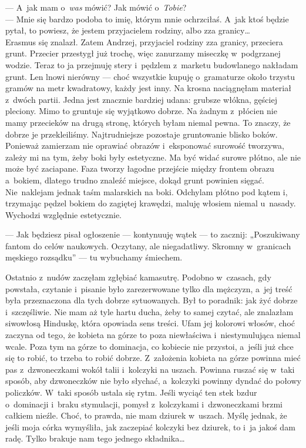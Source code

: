 \documentclass[9pt, a5paper]{memoir}
\begin{document}
--- A~jak mam o~\textit{was} mówić? Jak mówić o~\textit{Tobie}?\\
--- Mnie się bardzo podoba to imię, którym mnie ochrzciłaś. A~jak ktoś będzie pytał, to powiesz, że jestem przyjacielem rodziny, albo zza granicy\dots\\
Erasmus się znalazł. Zatem Andrzej, przyjaciel rodziny zza granicy, przeciera grunt. Przecier przestygł już trochę, więc zanurzamy miseczkę w~podgrzanej wodzie. Teraz to ja przejmuję stery i~pędzlem z~marketu budowlanego nakładam grunt. Len lnowi nierówny --- choć wszystkie kupuję o~gramaturze około trzystu gramów na metr kwadratowy, każdy jest inny. Na krosna naciągnęłam materiał z~dwóch partii. Jedna jest znacznie bardziej udana: grubsze włókna, gęściej pleciony. Mimo to gruntuje się wyjątkowo dobrze. Na żadnym z~płócien nie mamy przecieków na drugą stronę, których byłam niemal pewna. To znaczy, że dobrze je przekleiliśmy. Najtrudniejsze pozostaje gruntowanie blisko boków. Ponieważ zamierzam nie oprawiać obrazów i~eksponować surowość tworzywa, zależy mi na tym, żeby boki były estetyczne. Ma być widać surowe płótno, ale nie może być zaciapane. Faza tworzy łagodne przejście między frontem obrazu a~bokiem, dlatego trudno znaleźć miejsce, dokąd grunt powinien sięgać. Nie~naklejam jednak taśm malarskich na boki. Odchylam płótno pod kątem i, trzymając pędzel bokiem do zagiętej krawędzi, maluję włosiem niemal u~nasady. Wychodzi względnie estetycznie.

--- Jak będziesz pisał ogłoszenie --- kontynuuję wątek --- to zacznij: „Poszukiwany fantom do celów naukowych. Oczytany, ale niegadatliwy. Skromny w~granicach męskiego rozsądku” --- tu wybuchamy śmiechem.

Ostatnio z~nudów zaczęłam zgłębiać kamasutrę. Podobno w~czasach, gdy powstała, czytanie i~pisanie było zarezerwowane tylko dla mężczyzn, a~jej treść była przeznaczona dla tych dobrze sytuowanych. Był to poradnik: jak żyć dobrze i~szczęśliwie. Nie mam aż tyle hartu ducha, żeby to samej czytać, ale znalazłam siwowłosą Hinduskę, która opowiada sens treści. Ufam jej kolorowi włosów, choć zaczyna od tego, że kobieta na górze to poza niewłaściwa i~niestymulująca niemal wcale. Poza tym na górze to dominacja, co kobiecie nie przystoi, a~jeśli już chce się to robić, to trzeba to robić dobrze. Z~założenia kobieta na górze powinna mieć pas z~dzwoneczkami wokół talii i~kolczyki na uszach. Powinna ruszać się w~taki sposób, aby dzwoneczków nie było słychać, a~kolczyki powinny dyndać do połowy policzków. W~taki sposób ustala się rytm. Jeśli wyciąć ten stek bzdur o~dominacji i~braku stymulacji, pomysł z~kolczykami i~dzwoneczkami brzmi całkiem nieźle. Choć, to prawda, nie mam dziurek w~uszach. Myślę jednak, że jeśli moja córka wymyśliła, jak zaczepiać kolczyki bez dziurek, to i~ja jakoś dam radę. Tylko brakuje nam tego jednego składnika\dots
\end{document}
